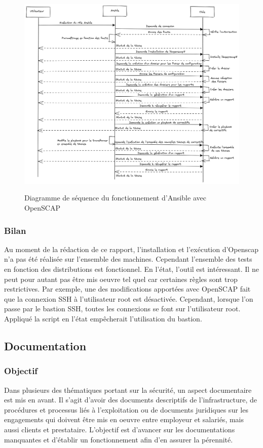 \documentclass[12pt]{article}
\begin{document}
\begin{figure}[!ht]
    \centering
    \includegraphics[width=\textwidth]{src/Ansible oscap.png}
    \label{fig:ansible_oscap}
    \caption{Diagramme de séquence du fonctionnement d'\gls{Ansible} avec OpenSCAP}
\end{figure}

\newpage
\subsubsection{Bilan}
Au moment de la rédaction de ce rapport, l'installation et l'exécution d'Openscap n'a pas été réalisée sur l'ensemble des machines. 
Cependant l'ensemble des tests en fonction des distributions est fonctionnel.
En l'état, l'outil est intéressant. 
Il ne peut pour autant pas être mis oeuvre tel quel car certaines règles sont trop restrictives.
Par exemple, une des modifications apportées avec \gls{OpenSCAP} fait que la connexion SSH à l'utilisateur root est désactivée.
Cependant, lorsque l'on passe par le bastion SSH, toutes les connexions se font sur l'utilisateur root.
Appliqué la script en l'état empêcherait l'utilisation du bastion.

\newpage
\subsection{Documentation}
\subsubsection{Objectif}
Dans plusieurs des thématiques portant sur la sécurité, un aspect documentaire est mis en avant. 
Il s'agit d'avoir des documents descriptifs de l'infrastructure, de procédures et processus liés à l'exploitation ou de documents juridiques sur les engagements qui doivent être mis en oeuvre entre employeur et salariés, mais aussi clients et prestataire. 
L'objectif est d'avancer sur les documentations manquantes et d'établir un fonctionnement afin d'en assurer la pérennité.
\end{document}
